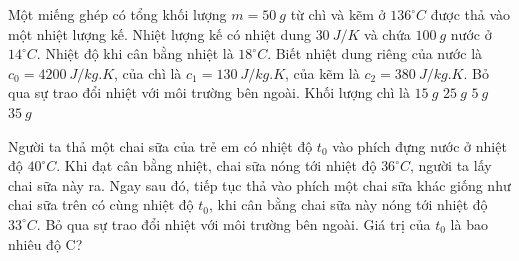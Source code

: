 \begin{ex} 
	Một miếng ghép có tổng khối lượng $m=50 \ g$ từ chì và kẽm ở $136^\circ C$ được thả vào một nhiệt lượng kế. Nhiệt lượng kế có  nhiệt dung $30\ J/K$ và chứa $100 \ g$ nước ở $14^\circ C$. Nhiệt độ khi cân bằng nhiệt là $18^\circ C$.  Biết nhiệt dung riêng của nước là $c_0=4200 \ J /kg.K$, của chì là $c_1=130 \ J /kg.K$, của kẽm là $c_2=380 \ J /kg.K$. Bỏ qua sự trao đổi nhiệt với môi trường bên ngoài. Khối lượng chì là
	\choice
	{\True $15 \ g$}
	{$25 \ g$}
	{$5 \ g$}
	{$35 \ g$}
\end{ex}

%



\begin{ex} 
	Người ta thả một chai sữa của trẻ em có nhiệt độ $t_0$ vào phích đựng nước ở nhiệt độ $40^\circ C$. Khi đạt cân bằng nhiệt, chai sữa nóng tới nhiệt độ $36^\circ C$, người ta lấy chai sữa này ra. Ngay sau đó, tiếp tục thả vào phích một chai sữa khác giống như chai sữa trên có cùng nhiệt độ $t_0$, khi cân bằng chai sữa này nóng tới nhiệt độ $33^\circ C$. Bỏ qua sự trao đổi nhiệt với môi trường bên ngoài. Giá trị của $t_0$ là bao nhiêu độ C?
\end{ex}

